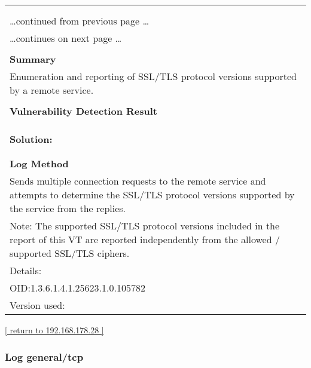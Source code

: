 \documentclass{article}
\begin{document}
\begin{longtable}{|p{}|}
\hline
\rowcolor{gvm_log}{\color{white}{Log (CVSS: 0.0) }}\\
\rowcolor{gvm_log}{\color{white}{NVT: SSL/TLS: Version Detection}}\\
\hline
\endfirsthead
\hfill\ldots continued from previous page \ldots \\
\hline
\endhead
\hline
\ldots continues on next page \ldots \\
\endfoot
\hline
\endlastfoot
\\
\textbf{Summary}\\
Enumeration and reporting of SSL/TLS protocol versions supported
  by a remote service.\\

        \hline
        \\
\textbf{Vulnerability Detection Result}\\
\rowcolor{white}{\verb=The remote SSL/TLS service supports the following SSL/TLS protocol version(s):=}\\
\rowcolor{white}{\verb=TLSv1.3=}\\

          \hline
          \\
\textbf{Solution:}\\
\\


        \hline
        \\
\textbf{Log Method}\\
Sends multiple connection requests to the remote service and
  attempts to determine the SSL/TLS protocol versions supported by the service from the replies.\\
  Note: The supported SSL/TLS protocol versions included in the report of this VT are reported
  independently from the allowed / supported SSL/TLS ciphers.\\
Details:
\rowcolor{white}{\verb=SSL/TLS: Version Detection=}\\
OID:1.3.6.1.4.1.25623.1.0.105782\\
Version used:
\rowcolor{white}{\verb=2021-12-06T15:42:24Z=}\\
\end{longtable}

\begin{footnotesize}\hyperref[host:192.168.178.28]{[ return to 192.168.178.28 ]}\end{footnotesize}
\subsubsection{Log general/tcp}
\label{port:192.168.178.28 general/tcp Log}
\end{document}
